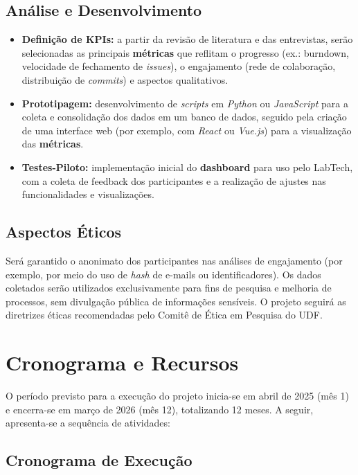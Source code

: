 \documentclass[
	12pt,           %
	openright,      %
	oneside,        %
	a4paper,        %
	brazil          %
]{abntex2}
\begin{document}
\subsection{Análise e Desenvolvimento}
\begin{itemize}
    \item \textbf{Definição de KPIs:} a partir da revisão de literatura e das entrevistas, serão selecionadas as principais \textbf{métricas} que reflitam o progresso (ex.: burndown, velocidade de fechamento de \emph{issues}), o engajamento (rede de colaboração, distribuição de \emph{commits}) e aspectos qualitativos.
    \item \textbf{Prototipagem:} desenvolvimento de \emph{scripts} em \textit{Python} ou \textit{JavaScript} para a coleta e consolidação dos dados em um banco de dados, seguido pela criação de uma interface web (por exemplo, com \emph{React} ou \emph{Vue.js}) para a visualização das \textbf{métricas}.
    \item \textbf{Testes-Piloto:} implementação inicial do \textbf{dashboard} para uso pelo LabTech, com a coleta de feedback dos participantes e a realização de ajustes nas funcionalidades e visualizações.
\end{itemize}

\subsection{Aspectos Éticos}
Será garantido o anonimato dos participantes nas análises de engajamento (por exemplo, por meio do uso de \emph{hash} de e-mails ou identificadores). Os dados coletados serão utilizados exclusivamente para fins de pesquisa e melhoria de processos, sem divulgação pública de informações sensíveis. O projeto seguirá as diretrizes éticas recomendadas pelo Comitê de Ética em Pesquisa do UDF.

\section{Cronograma e Recursos}

O período previsto para a execução do projeto inicia-se em abril de 2025 (mês 1) e encerra-se em março de 2026 (mês 12), totalizando 12 meses. A seguir, apresenta-se a sequência de atividades:

\subsection{Cronograma de Execução}
\label{sec:cronograma}
\end{document}
